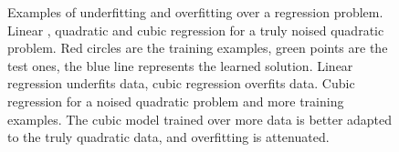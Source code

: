 \begin{figure}
\caption[Examples of underfitting and overfitting over a regression problem.]{Examples of underfitting and overfitting over a regression problem. Linear , quadratic  and cubic regression for a truly noised quadratic problem. Red circles are the training examples, green points are the test ones, the blue line represents the learned solution. Linear  regression underfits data, cubic   regression overfits data.  Cubic regression for a noised quadratic problem and more training examples. The cubic model trained over more data is better adapted to the truly quadratic data, and overfitting is attenuated.}\label{fig:poly_reg}

\end{figure}
